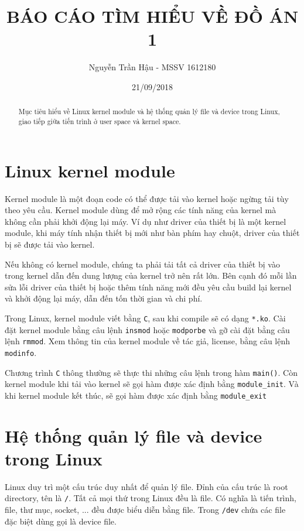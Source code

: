 \documentclass[12pt]{article}
\begin{document}
\title{BÁO CÁO TÌM HIỂU VỀ ĐỒ ÁN 1}
\author{Nguyễn Trần Hậu - MSSV 1612180}
\date{21/09/2018}
\maketitle

\begin{abstract}
Mục tiêu hiểu về Linux kernel module và hệ thống quản lý file và device trong Linux, giao tiếp giữa tiến trình ở user space và kernel space.
\end{abstract}

\section{Linux kernel module}

Kernel module là một đoạn code có thể được tải vào kernel hoặc ngừng tải tùy theo yêu cầu. Kernel module dùng để mở rộng các tính năng của kernel mà không cần phải khởi động lại máy. Ví dụ như driver của thiết bị là một kernel module, khi máy tính nhận thiết bị mới như bàn phím hay chuột, driver của thiết bị sẽ được tải vào kernel.

Nếu không có kernel module, chúng ta phải tải tất cả driver của thiết bị vào trong kernel dẫn đến dung lượng của kernel trở nên rất lớn. Bên cạnh đó mỗi lần sửa lỗi driver của thiết bị hoặc thêm tính năng mới đều yêu cầu build lại kernel và khởi động lại máy, dẫn đến tốn thời gian và chi phí.

Trong Linux, kernel module viết bằng \texttt{C}, sau khi compile sẽ có dạng \texttt{*.ko}. Cài đặt kernel module bằng câu lệnh \texttt{insmod} hoặc \texttt{modporbe} và gỡ cài đặt bằng câu lệnh \texttt{rmmod}. Xem thông tin của kernel module về tác giả, license,  bằng câu lệnh \texttt{modinfo}.

Chương trình \texttt{C} thông thường sẽ thực thi những câu lệnh trong hàm \texttt{main()}. Còn kernel module khi tải vào kernel sẽ gọi hàm được xác định bằng \texttt{module\_init}. Và khi kernel module kết thúc, sẽ gọi hàm được xác định bằng \texttt{module\_exit}

\section{Hệ thống quản lý file và device trong Linux}

Linux duy trì một cấu trúc duy nhất để quản lý file. Đỉnh của cấu trúc là root directory, tên là \texttt{/}. Tất cả mọi thứ trong Linux đều là file\cite{file}. Có nghĩa là tiến trình, file, thư mục, socket, ... đều được biểu diễn bằng file. Trong \texttt{/dev} chứa các file đặc biệt dùng gọi là device file.
\end{document}

